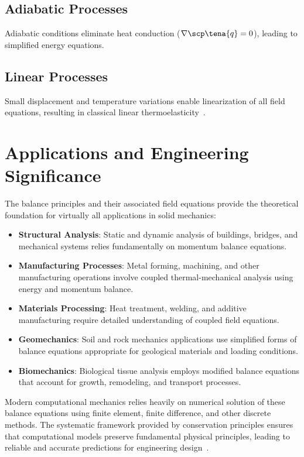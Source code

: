 \subsection{Adiabatic Processes}
Adiabatic conditions eliminate heat conduction ($\nabla \scp \tena{q} = 0$), leading to simplified energy equations.

\subsection{Linear Processes}
Small displacement and temperature variations enable linearization of all field equations, resulting in classical linear thermoelasticity~\autocite{Sadd.2019}.

\section{Applications and Engineering Significance}

The balance principles and their associated field equations provide the theoretical foundation for virtually all applications in solid mechanics:

\begin{itemize}
\item \textbf{Structural Analysis}: Static and dynamic analysis of buildings, bridges, and mechanical systems relies fundamentally on momentum balance equations.
\item \textbf{Manufacturing Processes}: Metal forming, machining, and other manufacturing operations involve coupled thermal-mechanical analysis using energy and momentum balance.
\item \textbf{Materials Processing}: Heat treatment, welding, and additive manufacturing require detailed understanding of coupled field equations.
\item \textbf{Geomechanics}: Soil and rock mechanics applications use simplified forms of balance equations appropriate for geological materials and loading conditions.
\item \textbf{Biomechanics}: Biological tissue analysis employs modified balance equations that account for growth, remodeling, and transport processes.
\end{itemize}

Modern computational mechanics relies heavily on numerical solution of these balance equations using finite element, finite difference, and other discrete methods. The systematic framework provided by conservation principles ensures that computational models preserve fundamental physical principles, leading to reliable and accurate predictions for engineering design~\autocite{Sadd.2019}.

